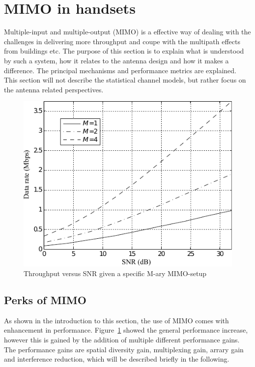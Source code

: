 \section{MIMO in handsets} %
\label{sec:mimo_in_handsets}
Multiple-input and multiple-output (MIMO) is a effective way of dealing with the challenges in delivering more throughput and coupe with the multipath effects from buildings etc. The purpose of this section is to explain what is understood by such a system, how it relates to the antenna design and how it makes a difference. The principal mechanisms and performance metrics are explained. This section will not describe the statistical channel models, but rather focus on the antenna related perspectives. 

\begin{figure}[htbp]
  \centering
  \includegraphics[scale=1.2]{img/analysis/datarateMimo}
  \caption{Throughput versus SNR given a specific M-ary MIMO-setup\cite{Ezio2007MIMO}}
  \label{fig:mimo-throughput}
\end{figure}

\subsection{Perks of MIMO} 
As shown in the introduction to this section, the use of MIMO comes with enhancement in performance. Figure~\ref{fig:mimo-throughput} showed the general performance increase, however this is gained by the addition of multiple different performance gains. The performance gains are spatial diversity gain, multiplexing gain, arrary gain and interference reduction\cite{Ezio2007MIMO}, which will be described briefly in the following.

